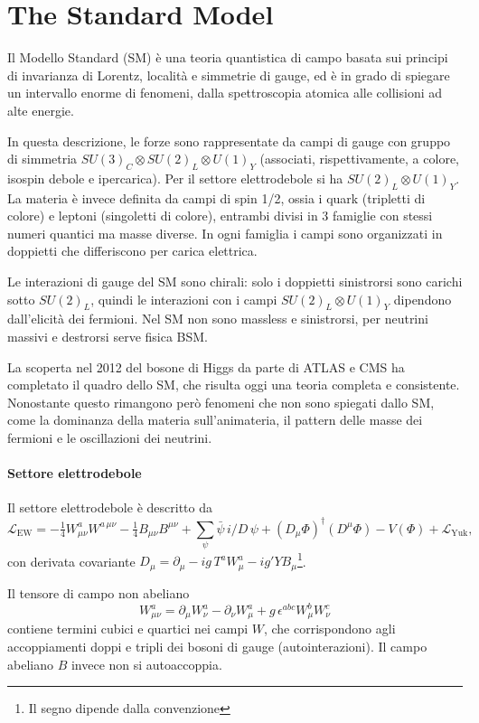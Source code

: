 \section{The Standard Model}
Il Modello Standard (SM) è una teoria quantistica di campo basata sui principi di invarianza di Lorentz, località e simmetrie di gauge, ed è in grado di spiegare un intervallo enorme di fenomeni, dalla spettroscopia atomica alle collisioni ad alte energie.

In questa descrizione, le forze sono rappresentate da campi di gauge con gruppo di simmetria $SU(3)_C\otimes SU(2)_L\otimes U(1)_Y$ (associati, rispettivamente, a colore, isospin debole e ipercarica). Per il settore elettrodebole si ha $SU(2)_L\otimes U(1)_Y$. La materia è invece definita da campi di spin 1/2, ossia i quark (tripletti di colore) e leptoni (singoletti di colore), entrambi divisi in 3 famiglie con stessi numeri quantici ma masse diverse. In ogni famiglia i campi sono organizzati in doppietti che differiscono per carica elettrica.

Le interazioni di gauge del SM sono chirali: solo i doppietti sinistrorsi sono carichi sotto $SU(2)_L$, quindi le interazioni con i campi $SU(2)_L\otimes U(1)_Y$ dipendono dall'elicità dei fermioni. Nel SM non sono massless e sinistrorsi, per neutrini massivi e destrorsi serve fisica BSM.

La scoperta nel 2012 del bosone di Higgs da parte di ATLAS e CMS ha completato il quadro dello SM, che risulta oggi una teoria completa e consistente. Nonostante questo rimangono però fenomeni che non sono spiegati dallo SM, come la dominanza della materia sull'animateria, il pattern delle masse dei fermioni e le oscillazioni dei neutrini. 

\paragraph{Settore elettrodebole} Il settore elettrodebole è descritto da $$\mathcal{L}_{\mathrm{EW}} = -\tfrac14 W^a_{\mu\nu}W^{a\,\mu\nu} - \tfrac14 B_{\mu\nu}B^{\mu\nu} + \sum_\psi \bar\psi\, i\slash{D}\,\psi + (D_\mu\Phi)^\dagger (D^\mu\Phi) - V(\Phi) + \mathcal{L}_{\mathrm{Yuk}},$$ con derivata covariante $D_\mu = \partial_\mu - i g\, T^a W^a_\mu - i g' Y B_\mu$\footnote{Il segno dipende dalla convenzione}.

Il tensore di campo non abeliano $$W^a_{\mu\nu} = \partial_\mu W^a_\nu - \partial_\nu W^a_\mu + g\,\epsilon^{abc} W^b_\mu W^c_\nu$$ contiene termini cubici e quartici nei campi $W$, che corrispondono agli accoppiamenti doppi e tripli dei bosoni di gauge (autointerazioni). Il campo abeliano $B$ invece non si autoaccoppia.

